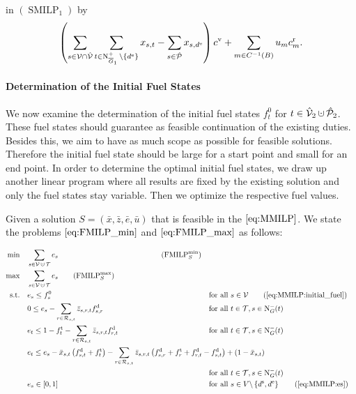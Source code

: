 in $(\operatorname{SMILP}_1)$ by
\begin{align*}
	\left(\sum_{s\in\mathcal{V}\cap\hat{\mathcal{V}}} \sum_{t\in\operatorname{N}^+_{\overline{G}_1}\backslash\left\{d^{\operatorname{e}}\right\}} x_{s,t} - \sum_{s\in\hat{\mathcal{P}}} x_{s,d^{\operatorname{e}}}\right) c^{\operatorname{v}} + \sum_{m\in C^{-1}(B)} u_m c^{\operatorname{r}}_m.
\end{align*}

\paragraph{Determination of the Initial Fuel States} \parfill

We now examine the determination of the initial fuel states $f^0_t$ for ${t\in\Vhat_2\cupdot\Phat_2}$. These fuel states should guarantee as feasible continuation of the existing duties. Besides this, we aim to have as much scope as possible for feasible solutions. Therefore the initial fuel state should be large for a start point and small for an end point. In order to determine the optimal initial fuel states, we draw up another linear program where all results are fixed by the existing solution and only the fuel states stay variable. Then we optimize the respective fuel values.

Given a solution ${S=\left(\bar{x},\bar{z},\bar{e},\bar{u}\right)}$ that is feasible in the $\eqref{eq:MMILP}$. We state the problems $\eqref{eq:FMILP_min}$ and $\eqref{eq:FMILP_max}$ as follows:

\begin{align}
	\min \quad & \sum_{s\in\mathcal{V}\cupdot\mathcal{T}} e_s \hphantom{\sum_{s\in\mathcal{V}} \sum_{t\in\Nout(s)\backslash\{d^{\operatorname{e}}\}} x_{s,t}\cv + u_m} \tag{$\operatorname{FMILP}^{\min}_S$} \label{eq:FMILP_min} \\
	\max \quad & \sum_{s\in\mathcal{V}\cupdot\mathcal{T}} e_s \tag{$\operatorname{FMILP}^{\max}_S$} \label{eq:FMILP_max} \\
	\text{s.t.} \quad & e_s \leq f_s^0 & & \text{for all } s\in\mathcal{V} \tag{\ref{eq:MMILP:initial_fuel}} \\
	& 0 \leq e_s - \sum_{r\in\Rst} \bar{z}_{s,r,t}\fd_{s,r} & & \text{for all } t\in\mathcal{T}, s\in\Nin(t) \label{eq:FMILP:min_fuel} \\
	& e_t \leq 1 - \ft_t - \sum_{r\in\Rst} \bar{z}_{s,r,t}\fd_{r,t} & & \text{for all } t\in\mathcal{T}, s\in\Nin(t) \label{eq:FMILP:max_fuel} \\
	& \omit\rlap{$\displaystyle{e_t \leq e_s - \bar{x}_{s,t}\left(f_{s,t}^{\operatorname{d}}+f_t^{\operatorname{t}}\right) - \sum_{r\in\Rst} \bar{z}_{s,r,t}\left(\fd_{s,r}+\ft_r+\fd_{r,t}-\fd_{s,t}\right) + \left(1-\bar{x}_{s,t}\right)}$} \nonumber \\
	& & & \text{for all } t\in\mathcal{T}, s\in\Nin(t) \label{eq:FMILP:fuel_consumption} \\
	& e_s\in[0,1] & & \text{for all } s\in V\backslash\left\{d^{\operatorname{s}},d^{\operatorname{e}}\right\} \tag{\ref{eq:MMILP:es}}
\end{align}

